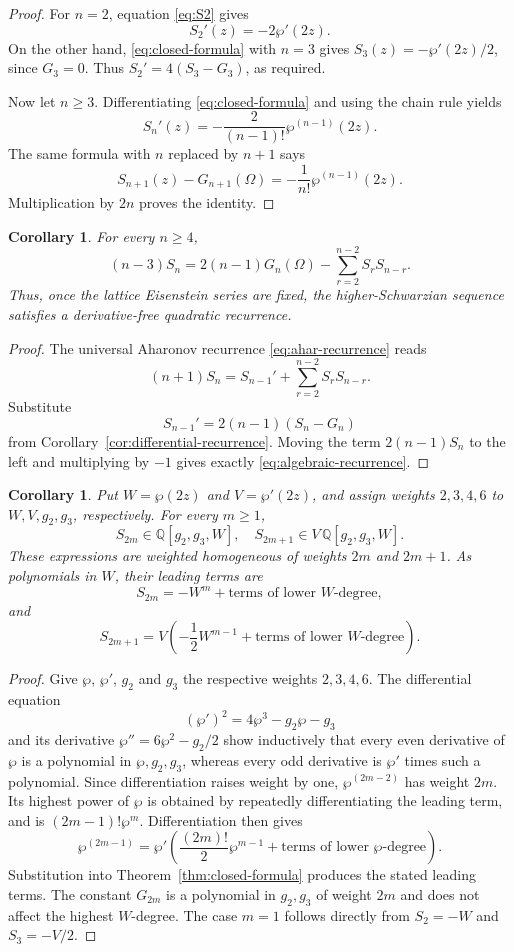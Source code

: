 \documentclass[11pt]{amsart}
\newtheorem{cor}[thm]{Corollary}
\theoremstyle{definition}
\theoremstyle{remark}
\numberwithin{equation}{section}
\begin{document}
\begin{proof}
For $n=2$, equation \eqref{eq:S2} gives
\[
S_2'(z)=-2\wp'(2z).
\]
On the other hand, \eqref{eq:closed-formula} with $n=3$ gives
$S_3(z)=-\wp'(2z)/2$, since $G_3=0$. Thus
$S_2'=4(S_3-G_3)$, as required.

Now let $n\geq3$. Differentiating \eqref{eq:closed-formula} and using the
chain rule yields
\[
S_n'(z)=-\frac{2}{(n-1)!}\wp^{(n-1)}(2z).
\]
The same formula with $n$ replaced by $n+1$ says
\[
S_{n+1}(z)-G_{n+1}(\Omega)
=-\frac{1}{n!}\wp^{(n-1)}(2z).
\]
Multiplication by $2n$ proves the identity.
\end{proof}

\begin{cor}\label{cor:algebraic-recurrence}
For every $n\geq4$,
\begin{equation}\label{eq:algebraic-recurrence}
(n-3)S_n
=
2(n-1)G_n(\Omega)
-
\sum_{r=2}^{n-2}S_rS_{n-r}.
\end{equation}
Thus, once the lattice Eisenstein series are fixed, the higher-Schwarzian sequence satisfies a derivative-free quadratic recurrence.
\end{cor}

\begin{proof}
The universal Aharonov recurrence \eqref{eq:ahar-recurrence} reads
\[
(n+1)S_n=S_{n-1}'+\sum_{r=2}^{n-2}S_rS_{n-r}.
\]
Substitute
\[
S_{n-1}'=2(n-1)(S_n-G_n)
\]
from Corollary~\ref{cor:differential-recurrence}. Moving the term
$2(n-1)S_n$ to the left and multiplying by $-1$ gives exactly
\eqref{eq:algebraic-recurrence}.
\end{proof}


\begin{cor}\label{cor:polynomial-structure}
Put $W=\wp(2z)$ and $V=\wp'(2z)$, and assign weights $2,3,4,6$ to $W,V,g_2,g_3$, respectively. For every $m\geq1$,
\[
S_{2m}\in\mathbb Q[g_2,g_3,W],
\quad
S_{2m+1}\in V\,\mathbb Q[g_2,g_3,W].
\]
These expressions are weighted homogeneous of weights $2m$ and $2m+1$. As polynomials in $W$, their leading terms are
\[
S_{2m}=-W^m+\text{terms of lower $W$-degree},
\]
and
\[
S_{2m+1}
=V\left(-\frac12W^{m-1}+\text{terms of lower $W$-degree}\right).
\]
\end{cor}

\begin{proof}
Give $\wp$, $\wp'$, $g_2$ and $g_3$ the respective weights $2,3,4,6$.
The differential equation
\[
(\wp')^2=4\wp^3-g_2\wp-g_3
\]
and its derivative $\wp''=6\wp^2-g_2/2$ show inductively that every even
derivative of $\wp$ is a polynomial in $\wp,g_2,g_3$, whereas every odd
derivative is $\wp'$ times such a polynomial. Since differentiation raises
weight by one, $\wp^{(2m-2)}$ has weight $2m$. Its highest power of $\wp$
is obtained by repeatedly differentiating the leading term, and is
$(2m-1)!\wp^m$. Differentiation then gives
\[
\wp^{(2m-1)}
=\wp'\left(\frac{(2m)!}{2}\wp^{m-1}+\text{terms of lower $\wp$-degree}\right).
\]
Substitution into Theorem~\ref{thm:closed-formula} produces the stated leading
terms. The constant $G_{2m}$ is a polynomial in $g_2,g_3$ of weight $2m$ and
does not affect the highest $W$-degree. The case $m=1$ follows directly from
$S_2=-W$ and $S_3=-V/2$.
\end{proof}
\end{document}
